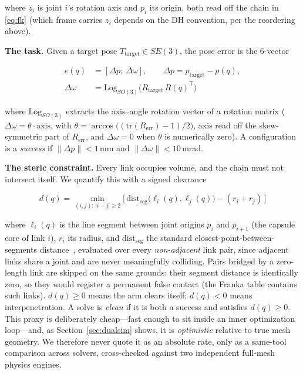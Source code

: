 \documentclass[10pt,conference]{IEEEtran}
\newcommand{\tp}{^{\mathsf{T}}}                       %
\begin{document}
where $z_i$ is joint $i$'s rotation axis and $p_i$ its origin, both read off the
chain in \eqref{eq:fk} (which frame carries $z_i$ depends on the DH convention,
per the reordering above).

\textbf{The task.} Given a target pose $T_{\mathrm{target}} \in SE(3)$, the pose
error is the 6-vector

\begin{equation}
\begin{aligned}
e(q) &= [\Delta p;\ \Delta\omega], \qquad
\Delta p = p_{\mathrm{target}} - p(q),\\
\Delta\omega &= \mathrm{Log}_{SO(3)}\!\big( R_{\mathrm{target}}\,R(q)\tp \big)
\end{aligned}
\label{eq:err}
\end{equation}

where $\mathrm{Log}_{SO(3)}$ extracts the axis--angle rotation vector of a
rotation matrix ($\Delta\omega = \theta \cdot \mathrm{axis}$, with
$\theta = \arccos\!\big((\mathrm{tr}(R_{\mathrm{err}}) - 1)/2\big)$,
$\mathrm{axis}$ read off the skew-symmetric part of $R_{\mathrm{err}}$, and
$\Delta\omega = 0$ when $\theta$ is numerically zero). A configuration is a
\emph{success} if $\|\Delta p\| < 1$\,mm and $\|\Delta\omega\| < 10$\,mrad.

\textbf{The steric constraint.} Every link occupies volume, and the chain must
not intersect itself. We quantify this with a signed clearance

\begin{equation}
d(q) = \!\!\min_{(i,j):\,|i-j| \ge 2}\!\!
\big[\, \mathrm{dist}_{\mathrm{seg}}\big(\ell_i(q),\ell_j(q)\big) - (r_i + r_j) \,\big]
\label{eq:clear}
\end{equation}

where $\ell_i(q)$ is the line segment between joint origins $p_i$ and $p_{i+1}$
(the capsule core of link $i$), $r_i$ its radius, and
$\mathrm{dist}_{\mathrm{seg}}$ the standard closest-point-between-segments
distance~\cite{b41}, evaluated over every \emph{non-adjacent} link pair, since
adjacent links share a joint and are never meaningfully colliding. Pairs bridged
by a zero-length link are skipped on the same grounds: their segment distance is
identically zero, so they would register a permanent false contact (the Franka
table contains such links). $d(q) \ge 0$ means the arm clears itself;
$d(q) < 0$ means interpenetration. A solve is \emph{clean} if it is both a
success and satisfies $d(q) \ge 0$. This proxy is deliberately cheap---fast
enough to sit inside an inner optimization loop---and, as
Section~\ref{sec:dualsim} shows, it is \emph{optimistic} relative to true mesh
geometry. We therefore never quote it as an absolute rate, only as a same-tool
comparison across solvers, cross-checked against two independent full-mesh
physics engines.
\end{document}
